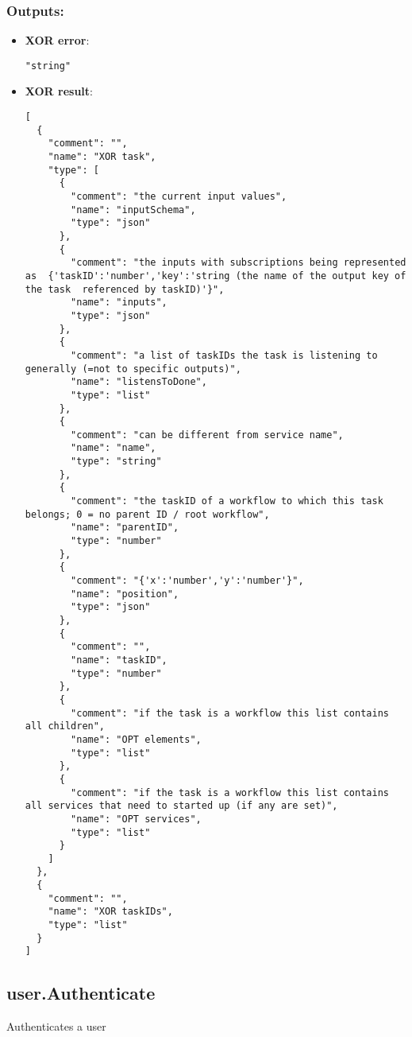 \subsubsection*{Outputs:}
\begin{itemize}
    \item \textbf{XOR error}: 
\begin{lstlisting}
"string"
\end{lstlisting}
    \item \textbf{XOR result}: 
\begin{lstlisting}
[
  {
    "comment": "", 
    "name": "XOR task", 
    "type": [
      {
        "comment": "the current input values", 
        "name": "inputSchema", 
        "type": "json"
      }, 
      {
        "comment": "the inputs with subscriptions being represented as  {'taskID':'number','key':'string (the name of the output key of the task  referenced by taskID)'}", 
        "name": "inputs", 
        "type": "json"
      }, 
      {
        "comment": "a list of taskIDs the task is listening to generally (=not to specific outputs)", 
        "name": "listensToDone", 
        "type": "list"
      }, 
      {
        "comment": "can be different from service name", 
        "name": "name", 
        "type": "string"
      }, 
      {
        "comment": "the taskID of a workflow to which this task belongs; 0 = no parent ID / root workflow", 
        "name": "parentID", 
        "type": "number"
      }, 
      {
        "comment": "{'x':'number','y':'number'}", 
        "name": "position", 
        "type": "json"
      }, 
      {
        "comment": "", 
        "name": "taskID", 
        "type": "number"
      }, 
      {
        "comment": "if the task is a workflow this list contains all children", 
        "name": "OPT elements", 
        "type": "list"
      }, 
      {
        "comment": "if the task is a workflow this list contains all services that need to started up (if any are set)", 
        "name": "OPT services", 
        "type": "list"
      }
    ]
  }, 
  {
    "comment": "", 
    "name": "XOR taskIDs", 
    "type": "list"
  }
]
\end{lstlisting}
  \end{itemize}

\subsection{user.Authenticate}
Authenticates a user
